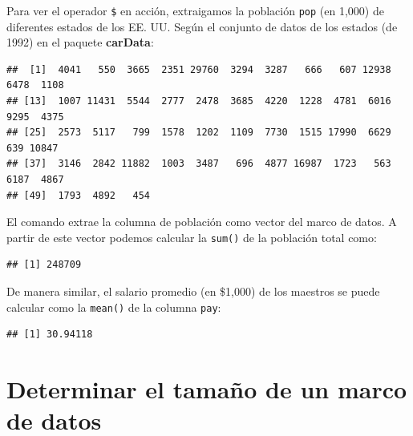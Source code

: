 \documentclass[
]{book}
\newenvironment{Shaded}{\begin{snugshade}}{\end{snugshade}}
\newcommand{\FunctionTok}[1]{\textcolor[rgb]{0.00,0.00,0.00}{#1}}
\newcommand{\NormalTok}[1]{#1}
\newcommand{\SpecialCharTok}[1]{\textcolor[rgb]{0.00,0.00,0.00}{#1}}
\begin{document}
Para ver el operador \texttt{\$} en acción, extraigamos la población \texttt{pop} (en 1,000) de diferentes estados de los EE. UU. Según el conjunto de datos de los estados (de 1992) en el paquete \textbf{carData}:

\begin{Shaded}
\end{Shaded}

\begin{verbatim}
##  [1]  4041   550  3665  2351 29760  3294  3287   666   607 12938  6478  1108
## [13]  1007 11431  5544  2777  2478  3685  4220  1228  4781  6016  9295  4375
## [25]  2573  5117   799  1578  1202  1109  7730  1515 17990  6629   639 10847
## [37]  3146  2842 11882  1003  3487   696  4877 16987  1723   563  6187  4867
## [49]  1793  4892   454
\end{verbatim}

El comando extrae la columna de población como vector del marco de datos. A partir de este vector podemos calcular la \texttt{sum()} de la población total como:

\begin{Shaded}
\end{Shaded}

\begin{verbatim}
## [1] 248709
\end{verbatim}

De manera similar, el salario promedio (en \$1,000) de los maestros se puede calcular como la \texttt{mean()} de la columna \texttt{pay}:

\begin{Shaded}
\end{Shaded}

\begin{verbatim}
## [1] 30.94118
\end{verbatim}

\hypertarget{determinar-el-tamauxf1o-de-un-marco-de-datos}{%
\section{Determinar el tamaño de un marco de datos}\label{determinar-el-tamauxf1o-de-un-marco-de-datos}}
\end{document}
